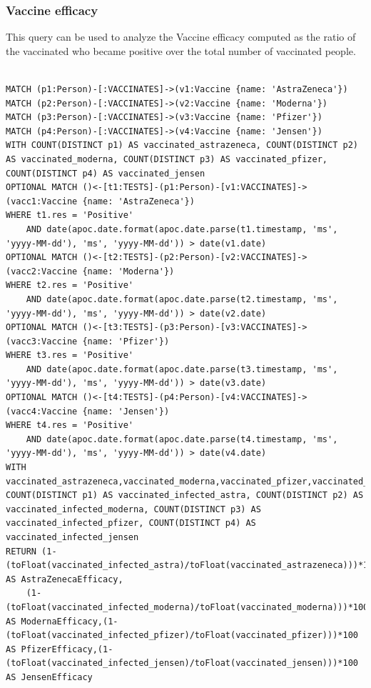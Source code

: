 \documentclass{article}
\begin{document}
\subsubsection{Vaccine efficacy}
This query can be used to analyze the Vaccine efficacy computed as the ratio of the vaccinated who became positive over the total number of vaccinated people.

\begin{lstlisting}[language=cypher, label=lst:cypher-example]

MATCH (p1:Person)-[:VACCINATES]->(v1:Vaccine {name: 'AstraZeneca'})
MATCH (p2:Person)-[:VACCINATES]->(v2:Vaccine {name: 'Moderna'})
MATCH (p3:Person)-[:VACCINATES]->(v3:Vaccine {name: 'Pfizer'})
MATCH (p4:Person)-[:VACCINATES]->(v4:Vaccine {name: 'Jensen'})
WITH COUNT(DISTINCT p1) AS vaccinated_astrazeneca, COUNT(DISTINCT p2) AS vaccinated_moderna, COUNT(DISTINCT p3) AS vaccinated_pfizer, COUNT(DISTINCT p4) AS vaccinated_jensen
OPTIONAL MATCH ()<-[t1:TESTS]-(p1:Person)-[v1:VACCINATES]->(vacc1:Vaccine {name: 'AstraZeneca'})
WHERE t1.res = 'Positive'
    AND date(apoc.date.format(apoc.date.parse(t1.timestamp, 'ms', 'yyyy-MM-dd'), 'ms', 'yyyy-MM-dd')) > date(v1.date)
OPTIONAL MATCH ()<-[t2:TESTS]-(p2:Person)-[v2:VACCINATES]->(vacc2:Vaccine {name: 'Moderna'})
WHERE t2.res = 'Positive'
    AND date(apoc.date.format(apoc.date.parse(t2.timestamp, 'ms', 'yyyy-MM-dd'), 'ms', 'yyyy-MM-dd')) > date(v2.date)                                       
OPTIONAL MATCH ()<-[t3:TESTS]-(p3:Person)-[v3:VACCINATES]->(vacc3:Vaccine {name: 'Pfizer'})
WHERE t3.res = 'Positive'
    AND date(apoc.date.format(apoc.date.parse(t3.timestamp, 'ms', 'yyyy-MM-dd'), 'ms', 'yyyy-MM-dd')) > date(v3.date)
OPTIONAL MATCH ()<-[t4:TESTS]-(p4:Person)-[v4:VACCINATES]->(vacc4:Vaccine {name: 'Jensen'})
WHERE t4.res = 'Positive'
    AND date(apoc.date.format(apoc.date.parse(t4.timestamp, 'ms', 'yyyy-MM-dd'), 'ms', 'yyyy-MM-dd')) > date(v4.date)
WITH vaccinated_astrazeneca,vaccinated_moderna,vaccinated_pfizer,vaccinated_jensen, COUNT(DISTINCT p1) AS vaccinated_infected_astra, COUNT(DISTINCT p2) AS vaccinated_infected_moderna, COUNT(DISTINCT p3) AS vaccinated_infected_pfizer, COUNT(DISTINCT p4) AS vaccinated_infected_jensen
RETURN (1- (toFloat(vaccinated_infected_astra)/toFloat(vaccinated_astrazeneca)))*100 AS AstraZenecaEfficacy,
    (1- (toFloat(vaccinated_infected_moderna)/toFloat(vaccinated_moderna)))*100 AS ModernaEfficacy,(1- (toFloat(vaccinated_infected_pfizer)/toFloat(vaccinated_pfizer)))*100 AS PfizerEfficacy,(1- (toFloat(vaccinated_infected_jensen)/toFloat(vaccinated_jensen)))*100 AS JensenEfficacy
\end{lstlisting}
\end{document}
